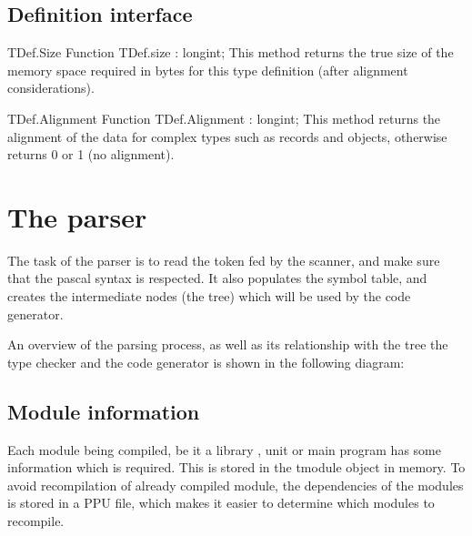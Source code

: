 \documentclass [12pt]{article}
\begin{document}
\subsection{Definition interface}
\label{subsec:definition}

\begin{function}{TDef.Size}
\Declaration
Function TDef.size : longint;
\Description
This method returns the true size of the memory space required in bytes for
this type definition (after alignment considerations). 
\end{function}

\begin{function}{TDef.Alignment}
\Declaration
Function TDef.Alignment : longint; 
\Description
This method returns the alignment of the data for complex types such as
records and objects, otherwise returns 0 or 1 (no alignment). 
\end{function}

\section{The parser}
\label{sec:mylabel5}

The task of the parser is to read the token fed by the scanner, and make 
sure that the pascal syntax is respected. It also populates the symbol 
table, and creates the intermediate nodes (the tree) which will be used by 
the code generator.

An overview of the parsing process, as well as its relationship with the 
tree the type checker and the code generator is shown in the following 
diagram:

\subsection{Module information}
\label{subsec:module}

Each module being compiled, be it a library , unit or main program has some 
information which is required. This is stored in the tmodule object in 
memory. To avoid recompilation of already compiled module, the dependencies 
of the modules is stored in a PPU file, which makes it easier to determine 
which modules to recompile.
\end{document}
